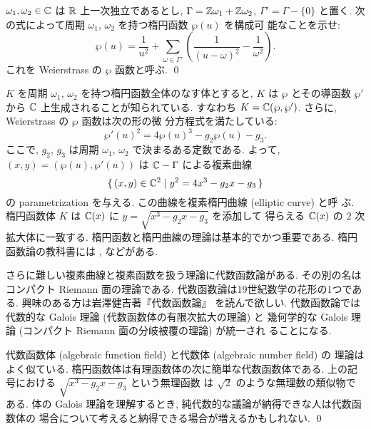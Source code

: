 \documentclass[12pt,twoside]{jarticle}
\begin{document}
\begin{question}[Weierstrass の $\wp$ 函数]
  $\omega_1,\omega_2\in{\mathbb C}$ は ${\mathbb R}$ 上一次独立であるとし,
  $\Gamma = {\mathbb Z}\omega_1 + {\mathbb Z}\omega_2$, $\Gamma'=\Gamma - \{0\}$ と置く.
  次の式によって周期 $\omega_1$, $\omega_2$ を持つ楕円函数 $\wp(u)$ を構成可
  能なことを示せ: 
  \begin{equation*}
    \wp(u) 
    = \frac{1}{u^2} 
    + \sum_{\omega\in\Gamma'}
    \left( \frac{1}{(u-\omega)^2} - \frac{1}{\omega^2} \right).
  \end{equation*}
  これを Weierstrass の $\wp$ 函数と呼ぶ. \qed
\end{question}

\begin{guide}
  $K$ を周期 $\omega_1$, $\omega_2$ を持つ楕円函数全体のなす体とすると,
  $K$ は $\wp$ とその導函数 $\wp'$ から ${\mathbb C}$ 上生成されることが知られている.
  すなわち $K={\mathbb C}(\wp,\wp')$.  さらに, Weierstrass の $\wp$ 函数は次の形の微
  分方程式を満たしている:
  \begin{equation*}
    \wp'(u)^2 = 4\wp(u)^3 - g_2\wp(u) - g_3.
  \end{equation*}
  ここで, $g_2$, $g_3$ は周期 $\omega_1$, $\omega_2$ で決まるある定数である.
  よって, $(x,y)=(\wp(u),\wp'(u))$ は ${\mathbb C}-\Gamma$ による複素曲線
  \begin{equation*}
    \{\, (x,y)\in{\mathbb C}^2 \mid y^2 = 4x^3 - g_2 x - g_3 \,\}
  \end{equation*}
  の parametrization を与える.  この曲線を複素楕円曲線 (elliptic curve) と呼
  ぶ.  楕円函数体 $K$ は ${\mathbb C}(x)$ に $y=\sqrt{x^3 - g_2 x - g_3}$ を添加して
  得らえる ${\mathbb C}(x)$ の $2$ 次拡大体に一致する.
  楕円函数と楕円曲線の理論は基本的でかつ重要である.
  楕円函数論の教科書には \cite{takeuchi}, \cite{umemura} などがある.

  さらに難しい複素曲線と複素函数を扱う理論に代数函数論がある.
  その別の名はコンパクト Riemann 面の理論である.
  代数函数論は19世紀数学の花形の1つである.
  興味のある方は岩澤健吉著『代数函数論』 \cite{iwasawa} を読んで欲しい.
  代数函数論では代数的な Galois 理論 (代数函数体の有限次拡大の理論) と 
  幾何学的な Galois 理論 (コンパクト Riemann 面の分岐被覆の理論) が統一され
  ることになる.

  代数函数体 (algebraic function field) と代数体 (algebraic number field) の
  理論はよく似ている. 楕円函数体は有理函数体の次に簡単な代数函数体である.
  上の記号における $\sqrt{x^3 - g_2 x - g_3}$ という無理函数
  は $\sqrt{2}$ のような無理数の類似物である.
  体の Galois 理論を理解するとき, 純代数的な議論が納得できな人は代数函数体の
  場合について考えると納得できる場合が増えるかもしれない.
  \qed
\end{guide}
\end{document}
